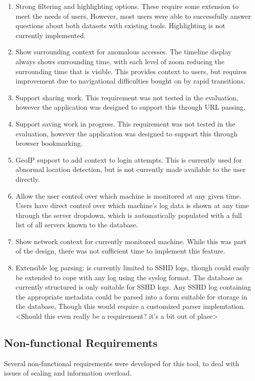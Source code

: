 \begin{enumerate}
\item{Strong filtering and highlighting options. These require some extension to meet the needs of users, However, most users were able to successfully answer questions about both datasets with existing tools. Highlighting is not currently implemented.}
\item{Show surrounding context for anomalous accesses. The timeline display always shows surrounding time, with each level of zoom reducing the surrounding time that is visible. This provides context to users, but requires improvement due to navigational difficulties bought on by rapid transitions.}
\item{Support sharing work. This requirement was not tested in the evaluation, however the application was designed to support this through URL passing.}
\item{Support saving work in progress. This requirement was not tested in the evaluation, however the application was designed to support this through browser bookmarking.}
\item{GeoIP support to add context to login attempts. This is currently used for abnormal location detection, but is not currently made available to the user directly.}
\item{Allow the user control over which machine is monitored at any given time. Users have direct control over which machine's log data is shown at any time through the server dropdown, which is automatically populated with a full list of all servers known to the database.}
\item{Show network context for currently monitored machine. While this was part of the design, there was not sufficient time to implement this feature.}
\item{Extensible log parsing:  is currently limited to SSHD logs, though could easily be extended to cope with any log using the syslog format. The database as currently structured is only suitable for SSHD logs. Any SSHD log containing the appropriate metadata could be parsed into a form suitable for storage in the database, Though this would require a customized parser implemtation. <Should this even really be a requirement? it's a bit out of place> }
\end{enumerate}

\subsection{Non-functional Requirements}
Several non-functional requirements were developed for this tool, to deal with issues of scaling and information overload.

